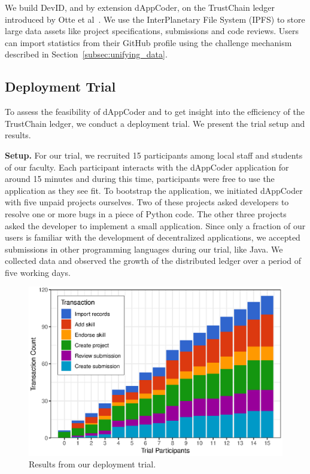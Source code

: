 We build DevID, and by extension dAppCoder, on the TrustChain ledger introduced by Otte et al~\cite{otte2017trustchain}.
We use the InterPlanetary File System (IPFS) to store large data assets like project specifications, submissions and code reviews.
Users can import statistics from their GitHub profile using the challenge mechanism described in Section~\ref{subsec:unifying_data}.

\subsection{Deployment Trial}
To assess the feasibility of dAppCoder and to get insight into the efficiency of the TrustChain ledger, we conduct a deployment trial.
We present the trial setup and results.

\textbf{Setup.}
For our trial, we recruited 15 participants among local staff and students of our faculty.
Each participant interacts with the dAppCoder application for around 15 minutes and during this time, participants were free to use the application as they see fit.
To bootstrap the application, we initiated dAppCoder with five unpaid projects ourselves.
Two of these projects asked developers to resolve one or more bugs in a piece of Python code.
The other three projects asked the developer to implement a small application.
Since only a fraction of our users is familiar with the development of decentralized applications, we accepted submissions in other programming languages during our trial, like Java.
We collected data and observed the growth of the distributed ledger over a period of five working days.


\begin{figure}[t!]
	\centering
	\includegraphics[width=.75\columnwidth]{devid/resources/experiment/experiment_1_unit.eps}
	\caption{Results from our deployment trial.}
	\label{fig:experiment_graph}
\end{figure}

